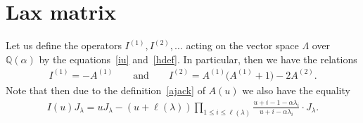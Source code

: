 \section{Lax matrix}\label{Section6}

Let us def\/ine the operators $I^{(1)},I^{(2)},\ldots$ acting on the vector
space $\Lambda$ over $\mathbb Q(\alpha)$ by the equations~\eqref{iu} and~\eqref{hdef}.
In particular, then we have the relations
\begin{gather*}
I^{(1)}=-A^{(1)}
\qquad
\text{and}
\qquad
I^{(2)}=A^{(1)}\big(A^{(1)}
+1\big)-2A^{(2)}.
\end{gather*}
Note that then due to the def\/inition~\eqref{ajack} of $A(u)$ we also have the equality
\begin{gather*}
I(u)J_\lambda=uJ_\lambda-(u+\ell(\lambda))\prod_{1\le i
\le\ell(\lambda)}\frac{u+i-1-\alpha\lambda_i}{u+i-\alpha\lambda_i}\cdot J_\lambda.
\end{gather*}

